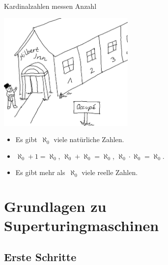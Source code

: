 \documentclass[12pt,compress,ngerman,utf8,t]{beamer}
\renewcommand{\_}{\mathpunct{.}\,}
\begin{document}
\begin{frame}{Kardinalzahlen messen Anzahl}
  \begin{center}
    \includegraphics[width=0.5\textwidth]{images/hilberts-hotel}
  \end{center}

  \begin{itemize}
    \item Es gibt~$\aleph_0$ viele natürliche Zahlen.
    \pause
    \item $\aleph_0 + 1 = \aleph_0$, \quad
    \pause
    $\aleph_0 + \aleph_0 = \aleph_0$, \quad
    \pause
    $\aleph_0 \cdot \aleph_0 = \aleph_0$.
    \pause
    \item Es gibt mehr als~$\aleph_0$ viele reelle Zahlen.
  \end{itemize}
\end{frame}


\section[Grundlagen]{Grundlagen zu Superturingmaschinen}

\subsection{Erste Schritte}
\end{document}
